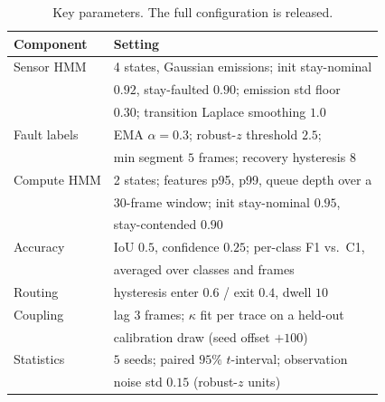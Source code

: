 \documentclass[conference]{IEEEtran}
\begin{document}
\begin{table}[t]
\caption{Key parameters. The full configuration is released.}
\label{tab:params}
\centering
\scriptsize
\setlength{\tabcolsep}{4pt}
\begin{tabular}{ll}
\toprule
\textbf{Component} & \textbf{Setting} \\
\midrule
Sensor HMM   & 4 states, Gaussian emissions; init stay-nominal \\
             & $0.92$, stay-faulted $0.90$; emission std floor \\
             & $0.30$; transition Laplace smoothing $1.0$ \\
Fault labels & EMA $\alpha{=}0.3$; robust-$z$ threshold $2.5$; \\
             & min segment $5$ frames; recovery hysteresis $8$ \\
Compute HMM  & 2 states; features p95, p99, queue depth over a \\
             & $30$-frame window; init stay-nominal $0.95$, \\
             & stay-contended $0.90$ \\
Accuracy     & IoU $0.5$, confidence $0.25$; per-class F1 vs.\ C1, \\
             & averaged over classes and frames \\
Routing      & hysteresis enter $0.6$ / exit $0.4$, dwell $10$ \\
Coupling     & lag $3$ frames; $\kappa$ fit per trace on a held-out \\
             & calibration draw (seed offset $+100$) \\
Statistics   & $5$ seeds; paired $95\%$ $t$-interval; observation \\
             & noise std $0.15$ (robust-$z$ units) \\
\bottomrule
\end{tabular}
\end{table}
\end{document}
